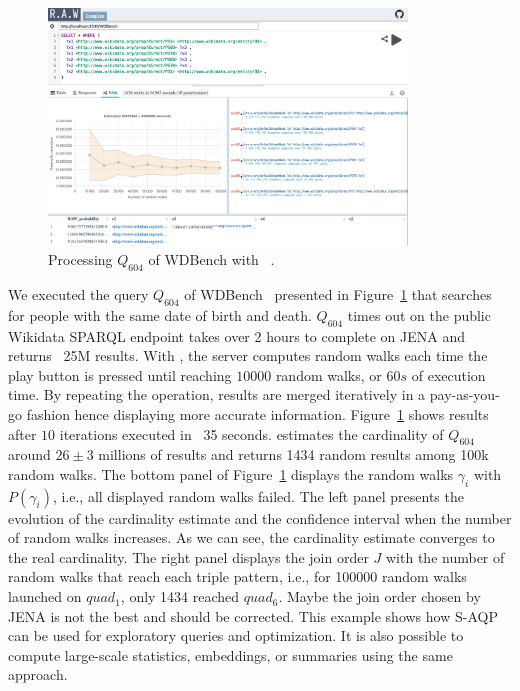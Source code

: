  \begin{figure}
   \centering
   \includegraphics[width=0.85\textwidth]{figures/raw_screenshot.png}
   \caption{\label{fig:raw_screenshot} Processing  $Q_{604}$ of
     WDBench\cite{angles2022wdbench} with ~\NAME.}
 \end{figure}


 We executed the query $Q_{604}$ of
 WDBench~\cite{angles2022wdbench} presented in
 Figure~\ref{fig:raw_screenshot} that searches for people with
 the same date of birth and death. $Q_{604}$ times out on the public
 Wikidata SPARQL endpoint takes over 2 hours to complete on JENA and returns ~25M results.
%
With \NAME, the server computes random walks each time the play button is pressed until reaching  $10 000$ random walks, or $60s$ of execution
 time. By repeating the operation, results are merged iteratively in a
 pay-as-you-go fashion hence displaying more accurate
 information. Figure~\ref{fig:raw_screenshot} shows results after
 $10$ iterations executed in ~35 seconds. \NAME estimates
 the cardinality of $Q_{604}$ around $26 \pm 3$ millions of results
 and returns 1434 random results among 100k random walks.
 The bottom panel of Figure~\ref{fig:raw_screenshot} displays the
 random walks $\gamma_i$ with $P(\gamma_i)$, i.e., all displayed
 random walks failed.  The left panel presents the evolution of the
 cardinality estimate and the confidence interval when the number of
 random walks increases. As we can see, the cardinality estimate
 converges to the real cardinality.  The right panel displays the join
 order $J$ with the number of random walks that reach each triple
 pattern, i.e., for 100000 random walks launched on $quad_1$, only 1434
 reached $quad_6$. Maybe the join order chosen by JENA is not the
 best and should be corrected. This example shows how S-AQP can be
 used for exploratory queries and optimization. It is also possible to compute large-scale statistics,
 embeddings, or summaries using the same approach.


